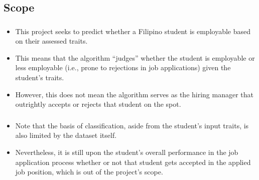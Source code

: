 \subsection{Scope}
\begin{frame}
\frametitle{\subsecname}
	\begin{itemize}
		\item This project seeks to predict whether a Filipino student is employable based on their assessed traits.
		\item This means that the algorithm ``judges'' whether the student is employable or less employable (i.e., prone to rejections in job applications) given the student's traits.
		\item However, this does not mean the algorithm serves as the hiring manager that outrightly accepts or rejects that student on the spot.
	\end{itemize}
\end{frame}

\begin{frame}
\frametitle{\subsecname}
	\begin{itemize}
		\item Note that the basis of classification, aside from the student's input traits, is also limited by the dataset itself.
		\item Nevertheless, it is still upon the student's overall performance in the job application process whether or not that student gets accepted in the applied job position, which is out of the project's scope.
	\end{itemize}
\end{frame}
